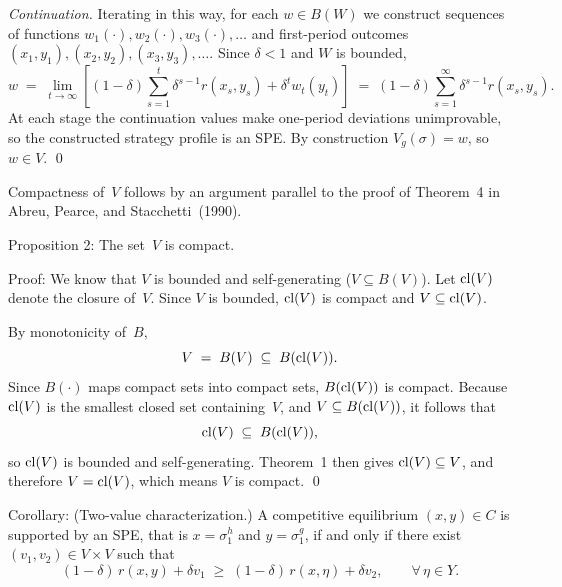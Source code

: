 \medskip\noindent
{\it Continuation.\/}
Iterating in this way, for each $w\in B(W)$ we construct sequences of
functions $w_1(\cdot),w_2(\cdot),w_3(\cdot),\ldots$ and
first-period outcomes $(x_1,y_1),(x_2,y_2),(x_3,y_3),\ldots$.
Since $\delta<1$ and $W$ is bounded,
$$  w
    \;=\; \lim_{t\to\infty}
           \left[
             (1-\delta)\sum_{s=1}^{t}\delta^{s-1}r(x_s,y_s)
             +\delta^t w_t(y_t)
           \right]
    \;=\; (1-\delta)\sum_{s=1}^{\infty}\delta^{s-1}r(x_s,y_s) .  $$
At each stage the continuation values make one-period deviations
unimprovable, so the constructed strategy profile is an SPE.  By
construction $V_g(\sigma)=w$, so $w\in V$.
\qed


Compactness of~$V$ follows by an
argument parallel to the proof of Theorem~4 in Abreu, Pearce, and
Stacchetti~(1990).

\medskip\noindent
{\sc Proposition 2:} 
The set~$V$ is compact.

\medskip\noindent
{\sc Proof:}
We know that $V$ is bounded and self-generating ($V\subseteq B(V)$).
Let ${\rm cl}(V)$ denote the closure of~$V$.  Since $V$ is bounded,
${\rm cl}(V)$ is compact and $V\subseteq{\rm cl}(V)$.

By monotonicity of~$B$,
$$  V \;=\; B(V) \;\subseteq\; B({\rm cl}(V)) .  $$
Since $B(\cdot)$ maps compact sets into compact sets,
$B({\rm cl}(V))$ is compact.  Because ${\rm cl}(V)$ is the smallest
closed set containing~$V$, and $V\subseteq B({\rm cl}(V))$, it follows
that
$$  {\rm cl}(V) \;\subseteq\; B({\rm cl}(V)) ,  $$
so ${\rm cl}(V)$ is bounded and self-generating.  Theorem~1 then gives
${\rm cl}(V)\subseteq V$, and therefore $V={\rm cl}(V)$, which means
$V$ is compact.
\qed


\medskip\noindent
{\sc Corollary:} (Two-value characterization.)
A competitive equilibrium $(x,y)\in C$ is supported by an SPE, that
is $x=\sigma^h_1$ and $y=\sigma^g_1$, if and only if there exist
$(v_1,v_2)\in V\times V$ such that
$$  (1-\delta)\,r(x,y)+\delta v_1
    \;\geq\;
    (1-\delta)\,r(x,\eta)+\delta v_2 ,
    \qquad \forall\,\eta\in Y .  $$


